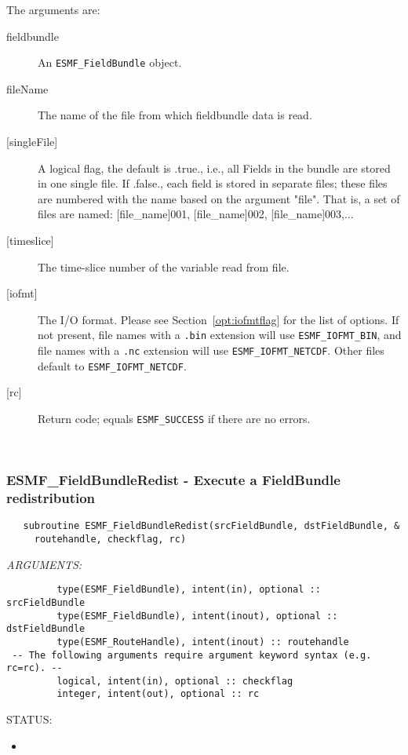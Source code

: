    The arguments are:
   \begin{description}
   \item[fieldbundle]
   An {\tt ESMF\_FieldBundle} object.
   \item[fileName]
   The name of the file from which fieldbundle data is read.
   \item[{[singleFile]}]
   A logical flag, the default is .true., i.e., all Fields in the bundle
   are stored in one single file. If .false., each field is stored
   in separate files; these files are numbered with the name based on the
   argument "file". That is, a set of files are named: [file\_name]001,
   [file\_name]002, [file\_name]003,...
   \item[{[timeslice]}]
   The time-slice number of the variable read from file.
   \item[{[iofmt]}]
   \begin{sloppypar}
   The I/O format. Please see Section~\ref{opt:iofmtflag} for the list
   of options. If not present, file names with a {\tt .bin} extension will
   use {\tt ESMF\_IOFMT\_BIN}, and file names with a {\tt .nc} extension
   will use {\tt ESMF\_IOFMT\_NETCDF}. Other files default to
   {\tt ESMF\_IOFMT\_NETCDF}.
   \end{sloppypar}
   \item[{[rc]}]
   Return code; equals {\tt ESMF\_SUCCESS} if there are no errors.
   \end{description}
   
 
\mbox{}\hrulefill\ 
 
\subsubsection [ESMF\_FieldBundleRedist] {ESMF\_FieldBundleRedist - Execute a FieldBundle redistribution}


  
\begin{verbatim}   subroutine ESMF_FieldBundleRedist(srcFieldBundle, dstFieldBundle, &
     routehandle, checkflag, rc)\end{verbatim}{\em ARGUMENTS:}
\begin{verbatim}         type(ESMF_FieldBundle), intent(in), optional :: srcFieldBundle
         type(ESMF_FieldBundle), intent(inout), optional :: dstFieldBundle
         type(ESMF_RouteHandle), intent(inout) :: routehandle
 -- The following arguments require argument keyword syntax (e.g. rc=rc). --
         logical, intent(in), optional :: checkflag
         integer, intent(out), optional :: rc\end{verbatim}
{\sf STATUS:}
   \begin{itemize}
   \item{}
   \end{itemize}
  
